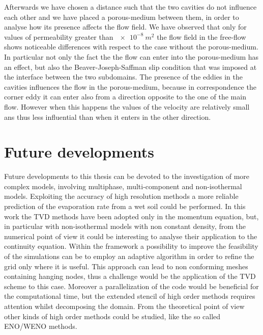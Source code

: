 Afterwards we have chosen a distance such that the two cavities do not 
influence each other and we have placed a porous-medium between them, in order 
to analyse how its presence affects the flow field. We have observed that only 
for values of permeability greater than $\SI{e-8}{m^2}$ the flow field in the 
free-flow shows noticeable differences with respect to the case without the 
porous-medium. In particular not only the fact the the flow can enter into the 
porous-medium has an effect, but also the Beaver-Joseph-Saffman slip condition 
that was imposed at the interface between the two subdomains. The presence of 
the eddies in the cavities influences the flow in the porous-medium, because in 
correspondence the corner eddy it can enter also from a direction opposite to 
the one of the main flow. However when this happens the values of the velocity 
are relatively small ans thus less influential than when it enters in the other 
direction.
\section{Future developments}
Future developments to this thesis can be devoted to the investigation of more 
complex models, involving multiphase, multi-component and non-isothermal 
models. Exploiting the accuracy of high resolution methods a more reliable 
prediction of the evaporation rate from a wet soil could be performed.
In this work the TVD methods have been adopted only in the momentum equation, 
but, in particular with non-isothermal models with non constant density, from 
the numerical point of view it could be interesting to analyse their 
application to the continuity equation.
Within the \DUMUX framework a possibility to improve the feasibility of the 
simulations can be to employ an adaptive algorithm in order to refine the grid 
only where it is useful. This approach can lead to non conforming meshes 
containing hanging nodes, thus a challenge would be the application of the TVD 
scheme to this case. Moreover a parallelization of the code would be beneficial 
for the computational time, but the extended stencil of high order methods 
requires attention whilst decomposing the domain.
From the theoretical point of view other kinds of high order methods could be 
studied, like the so called ENO/WENO methods.%

